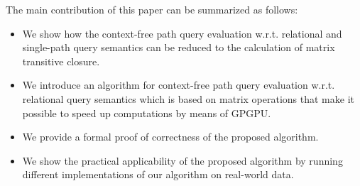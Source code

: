 The main contribution of this paper can be summarized as follows:
\begin{itemize}
	\item We show how the context-free path query evaluation w.r.t. relational and single-path query semantics can be reduced to the calculation of matrix transitive closure.
	\item We introduce an algorithm for context-free path query evaluation w.r.t. relational query semantics which is based on matrix operations that make it possible to speed up computations by means of GPGPU.
	\item We provide a formal proof of correctness of the proposed algorithm.
	\item We show the practical applicability of the proposed algorithm by running different implementations of our algorithm on real-world data.
\end{itemize}
